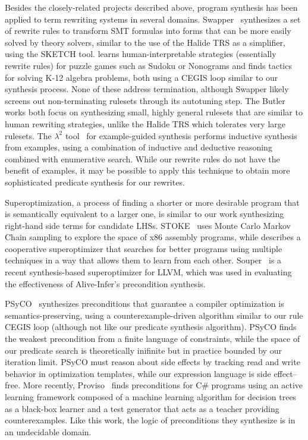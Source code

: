 \documentclass[acmsmall]{acmart}\settopmatter{}
\begin{document}
Besides the closely-related projects described above, program synthesis has been applied to term rewriting systems in several domains. Swapper~\cite{singh2016swapper} synthesizes a set of rewrite rules to transform SMT formulas into forms that can be more easily solved by theory solvers, similar to the use of the Halide TRS as a simplifier, using the SKETCH tool. \citet{butler2017synthesizing} learns human-interpretable strategies (essentially rewrite rules) for puzzle games such as Sudoku or Nonograms and \citet{butler2018framework} finds tactics for solving K-12 algebra problems, both using a CEGIS loop similar to our synthesis process. None of these address termination, although Swapper likely screens out non-terminating rulesets through its autotuning step. The Butler works both focus on synthesizing small, highly general rulesets that are similar to human rewriting strategies, unlike the Halide TRS which tolerates very large rulesets. The \textbf{$\lambda^2$} tool~\cite{feser2015lambda} for example-guided synthesis performs inductive synthesis from examples, using a combination of inductive and deductive reasoning combined with enumerative search.  While our rewrite rules do not have the benefit of examples, it may be possible to apply this technique to obtain more sophisticated predicate synthesis for our rewrites.

Superoptimization, a process of finding a shorter or more desirable program that is semantically equivalent to a larger one, is similar to our work synthesizing right-hand side terms for candidate LHSs. STOKE~\cite{schkufza2013stochastic} uses Monte Carlo Markov Chain sampling to explore the space of x86 assembly programs, while \citet{phothilimthana2016scaling} describes a cooperative superoptimizer that searches for better programs using multiple techniques in a way that allows them to learn from each other.  Souper~\cite{sasnauskas2017souper} is a recent synthesis-based superoptimizer for LLVM, which was used in evaluating the effectiveness of Alive-Infer's{} precondition synthesis.

PSyCO~\cite{lopes2014weakest} synthesizes preconditions that guarantee a compiler optimization is semantics-preserving, using a counterexample-driven algorithm similar to our rule CEGIS loop (although not like our predicate synthesis algorithm). PSyCO finds the weakest precondition from a finite language of constraints, while the space of our predicate search is theoretically inifinite but in practice bounded by our iteration limit. PSyCO must reason about side effects by tracking read and write behavior in optimization templates, while our expression language is side effect--free. More recently, Proviso~\cite{astorga2019learning} finds preconditions for C\# programs using an active learning framework composed of a machine learning algorithm for decision trees as a black-box learner and a test generator that acts as a teacher providing counterexamples. Like this work, the logic of preconditions they synthesize is in an undecidable domain.
\end{document}
